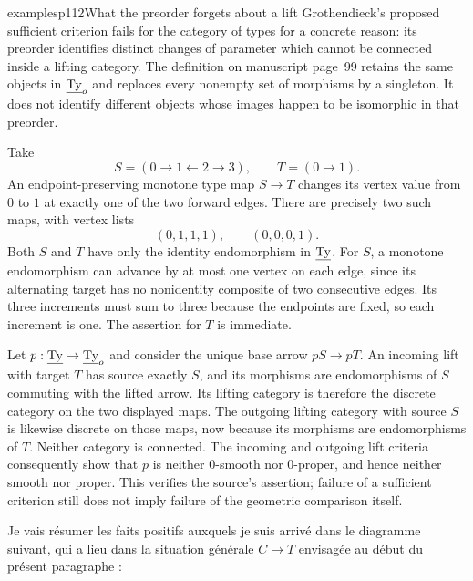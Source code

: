 \begin{dcomment}{examples}{p112}{What the preorder forgets about a lift}
Grothendieck's proposed sufficient criterion fails for the category of types for a concrete reason: its preorder identifies distinct changes of parameter which cannot be connected inside a lifting category. The definition on manuscript page~99 retains the same objects in $\underline{\mathrm{Ty}}_o$ and replaces every nonempty set of morphisms by a singleton. It does not identify different objects whose images happen to be isomorphic in that preorder.

Take
\[
 S=(0\longrightarrow1\longleftarrow2\longrightarrow3),
 \qquad T=(0\longrightarrow1).
\]
An endpoint-preserving monotone type map $S\to T$ changes its vertex value from $0$ to $1$ at exactly one of the two forward edges. There are precisely two such maps, with vertex lists
\[
                    (0,1,1,1),\qquad(0,0,0,1).
\]
Both $S$ and $T$ have only the identity endomorphism in $\underline{\mathrm{Ty}}$. For $S$, a monotone endomorphism can advance by at most one vertex on each edge, since its alternating target has no nonidentity composite of two consecutive edges. Its three increments must sum to three because the endpoints are fixed, so each increment is one. The assertion for $T$ is immediate.

Let $p:\underline{\mathrm{Ty}}\to\underline{\mathrm{Ty}}_o$ and consider the unique base arrow $pS\to pT$. An incoming lift with target $T$ has source exactly $S$, and its morphisms are endomorphisms of $S$ commuting with the lifted arrow. Its lifting category is therefore the discrete category on the two displayed maps. The outgoing lifting category with source $S$ is likewise discrete on those maps, now because its morphisms are endomorphisms of $T$. Neither category is connected. The incoming and outgoing lift criteria consequently show that $p$ is neither $0$-smooth nor $0$-proper, and hence neither smooth nor proper. This verifies the source's assertion; failure of a sufficient criterion still does not imply failure of the geometric comparison itself.
\end{dcomment}


Je vais résumer les faits positifs auxquels je suis arrivé dans le diagramme suivant, qui a lieu dans la situation générale $C \longrightarrow T$ envisagée au début du présent paragraphe :

